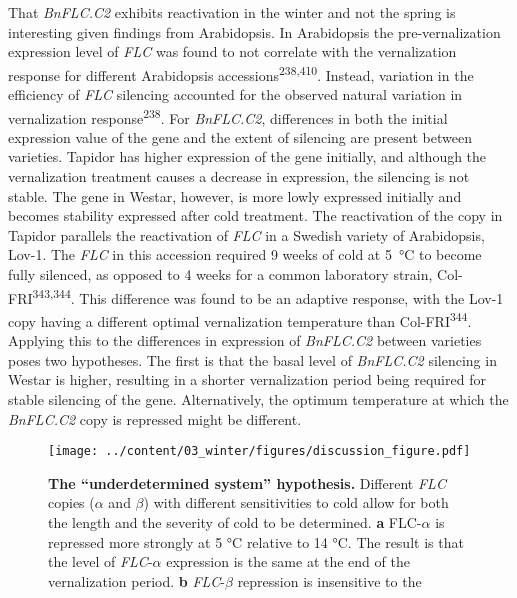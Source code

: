 \documentclass[12pt,]{book}
\begin{document}
That \emph{BnFLC.C2} exhibits reactivation in the winter and not the
spring is interesting given findings from Arabidopsis. In Arabidopsis
the pre-vernalization expression level of \emph{FLC} was found to not
correlate with the vernalization response for different Arabidopsis
accessions\textsuperscript{238,410}. Instead, variation in the
efficiency of \emph{FLC} silencing accounted for the observed natural
variation in vernalization response\textsuperscript{238}. For
\emph{BnFLC.C2}, differences in both the initial expression value of the
gene and the extent of silencing are present between varieties. Tapidor
has higher expression of the gene initially, and although the
vernalization treatment causes a decrease in expression, the silencing
is not stable. The gene in Westar, however, is more lowly expressed
initially and becomes stability expressed after cold treatment. The
reactivation of the copy in Tapidor parallels the reactivation of
\emph{FLC} in a Swedish variety of Arabidopsis, Lov-1. The \emph{FLC} in
this accession required 9 weeks of cold at 5~°C to become fully
silenced, as opposed to 4 weeks for a common laboratory strain,
Col-FRI\textsuperscript{343,344}. This difference was found to be an
adaptive response, with the Lov-1 copy having a different optimal
vernalization temperature than Col-FRI\textsuperscript{344}. Applying
this to the differences in expression of \emph{BnFLC.C2} between
varieties poses two hypotheses. The first is that the basal level of
\emph{BnFLC.C2} silencing in Westar is higher, resulting in a shorter
vernalization period being required for stable silencing of the gene.
Alternatively, the optimum temperature at which the \emph{BnFLC.C2} copy
is repressed might be different.

\begin{figure}[htbp]
\centering
\texttt{[image: ../content/03\_winter/figures/discussion\_figure.pdf]}
\caption{\textbf{The ``underdetermined system'' hypothesis.} Different
\emph{FLC} copies (\(\alpha\) and \(\beta\)) with different
sensitivities to cold allow for both the length and the severity of cold
to be determined. \textbf{a} FLC-\(\alpha\) is repressed more strongly
at 5 °C relative to 14 °C. The result is that the level of
\emph{FLC}-\(\alpha\) expression is the same at the end of the
vernalization period. \textbf{b} \emph{FLC}-\(\beta\) repression is
insensitive to the}\label{figure:3xx:underdetermined}
\end{figure}
\end{document}
